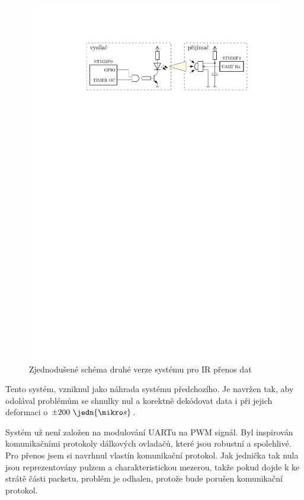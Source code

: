 \begin{figure}[H]
    \begin{center}
        \includegraphics[width=\textwidth]{img/ir-system}
    \end{center}
    \caption{Zjednodušené schéma druhé verze systému pro IR přenos dat}
\end{figure}

Tento systém, vzniknul jako náhrada systému předchozího. Je navržen tak, aby odolával problémům se shnulky nul a korektně dekódovat data i při jejich deformaci o $\pm200~\jedn{\mikro s}$.

Systém už není založen na modulování UARTu na PWM signál. Byl inspirován komunikačními protokoly dálkových ovladačů, které jsou robustní a spolehlivé. Pro přenos jsem si navrhnul vlastín komunikační protokol. Jak jednička tak nula jsou reprezentovány pulzem a charakteristickou mezerou, takže pokud dojde k ke strátě části packetu, problém je odhalen, protože bude porušen komunikační protokol.

